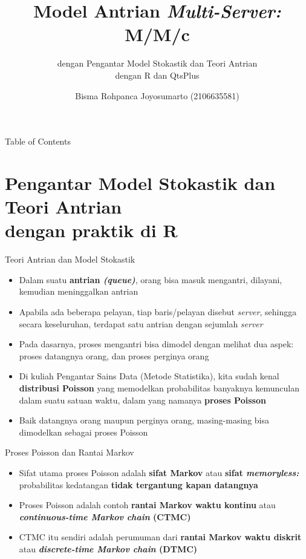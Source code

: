 \documentclass{beamer}
\title{Model Antrian \textit{Multi-Server:} M/M/c}
\subtitle{dengan Pengantar Model Stokastik dan Teori Antrian \\ dengan R dan QtsPlus}
\author{Bisma Rohpanca Joyosumarto (2106635581)}
\institute{Departemen Matematika FMIPA UI \\ Universitas Indonesia}
\date{
    Rabu, 13 November 2024

    Riset Operasi
    
    Tahun Ajaran 2024/2025 Semester Ganjil
}
\begin{document}
\frame{\titlepage}

\begin{frame}{Table of Contents}
    \tableofcontents
\end{frame}

\section[Pengantar Model Stokastik dan Teori Antrian. dengan praktik di R]{Pengantar Model Stokastik dan Teori Antrian \\ dengan praktik di R}

\begin{frame}{Teori Antrian dan Model Stokastik}
    \begin{itemize}
        \item Dalam suatu \textbf{antrian \textit{(queue)}}, orang bisa masuk mengantri, dilayani, kemudian meninggalkan antrian
        \item Apabila ada beberapa pelayan, tiap baris/pelayan disebut \textit{server}, sehingga secara keseluruhan, terdapat satu antrian dengan sejumlah \textit{server}
        \item Pada dasarnya, proses mengantri bisa dimodel dengan melihat dua aspek: proses datangnya orang, dan proses perginya orang
        \item Di kuliah Pengantar Sains Data (Metode Statistika), kita sudah kenal \textbf{distribusi Poisson} yang memodelkan probabilitas banyaknya kemunculan dalam suatu satuan waktu, dalam yang namanya \textbf{proses Poisson}
        \item Baik datangnya orang maupun perginya orang, masing-masing bisa dimodelkan sebagai proses Poisson
    \end{itemize}
\end{frame}

\begin{frame}{Proses Poisson dan Rantai Markov}
    \begin{itemize}
        \item Sifat utama proses Poisson adalah \textbf{sifat Markov} atau \textbf{sifat \textit{memoryless:}} probabilitas kedatangan \textbf{tidak tergantung kapan datangnya}
        \item Proses Poisson adalah contoh \textbf{rantai Markov waktu kontinu} atau \textbf{\textit{continuous-time Markov chain} (CTMC)}
        \item CTMC itu sendiri adalah perumuman dari \textbf{rantai Markov waktu diskrit} atau \textbf{\textit{discrete-time Markov chain} (DTMC)}
    \end{itemize}
\end{frame}
\end{document}
